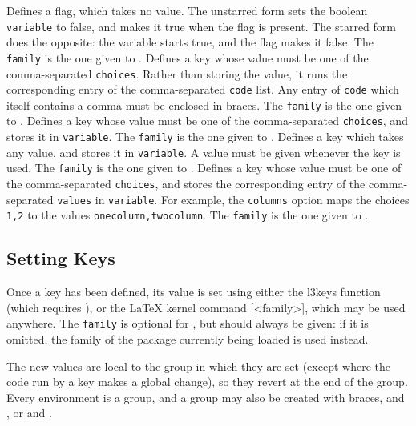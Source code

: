 				{
					Defines a flag, which takes no value. The unstarred form sets the boolean \texttt{variable} to false, and makes it true when the flag is present. The starred form does the opposite: the variable starts true, and the flag makes it false. The \texttt{family} is the one given to .
				}
				{
					Defines a key whose value must be one of the comma-separated \texttt{choices}. Rather than storing the value, it runs the corresponding entry of the comma-separated \texttt{code} list. Any entry of \texttt{code} which itself contains a comma must be enclosed in braces. The \texttt{family} is the one given to .
				}
				{
					Defines a key whose value must be one of the comma-separated \texttt{choices}, and stores it in \texttt{variable}. The \texttt{family} is the one given to .
				}
				{
					Defines a key which takes any value, and stores it in \texttt{variable}. A value must be given whenever the key is used. The \texttt{family} is the one given to .
				}
				{
					Defines a key whose value must be one of the comma-separated \texttt{choices}, and stores the corresponding entry of the comma-separated \texttt{values} in \texttt{variable}. For example, the \texttt{columns} option maps the choices \texttt{1,2} to the values \texttt{onecolumn,twocolumn}. The \texttt{family} is the one given to .
				}

		\subsection{Setting Keys}

			Once a key has been defined, its value is set using either the l3keys function  (which requires ), or the \LaTeX{} kernel command [<family>], which may be used anywhere. The \texttt{family} is optional for , but should always be given: if it is omitted, the family of the package currently being loaded is used instead.

			The new values are local to the group in which they are set (except where the code run by a  key makes a global change), so they revert at the end of the group. Every environment is a group, and a group may also be created with braces,  and , or  and .
